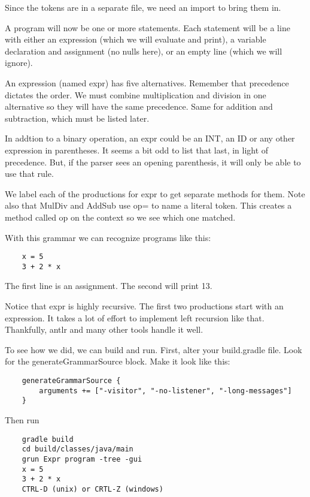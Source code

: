 Since the tokens are in a separate file, we need an import to bring them
in.

A program will now be one or more statements. Each statement will be a line
with either an expression (which we will evaluate and print), a variable
declaration and assignment (no nulls here), or an empty line (which we will
ignore).

An expression (named expr) has five alternatives. Remember that precedence
dictates the order. We must combine multiplication and division in
one alternative so they will have the same precedence. Same for addition
and subtraction, which must be listed later.

In addtion to a binary operation, an expr could be an INT, an ID or
any other expression in parentheses. It seems a bit odd to list that
last, in light of precedence. But, if the parser sees an opening parenthesis,
it will only be able to use that rule.

We label each of the productions for expr to get separate methods for them.
Note also that MulDiv and AddSub use op= to name a literal token.
This creates a method called op on the context so we see which one matched.

With this grammar we can recognize programs like this:

{\footnotesize
\begin{verbatim}
    x = 5
    3 + 2 * x
\end{verbatim}
}

The first line is an assignment. The second will print 13.

Notice that expr is highly recursive. The first two productions start
with an expression. It takes a lot of effort to implement left recursion
like that. Thankfully, antlr and many other tools handle it well.

To see how we did, we can build and run. First, alter your build.gradle
file. Look for the generateGrammarSource block. Make it look like this:

{\footnotesize
\begin{verbatim}
    generateGrammarSource {
        arguments += ["-visitor", "-no-listener", "-long-messages"]
    }
\end{verbatim}
}

Then run

{\footnotesize
\begin{verbatim}
    gradle build
    cd build/classes/java/main
    grun Expr program -tree -gui
    x = 5
    3 + 2 * x
    CTRL-D (unix) or CRTL-Z (windows)
\end{verbatim}
}

